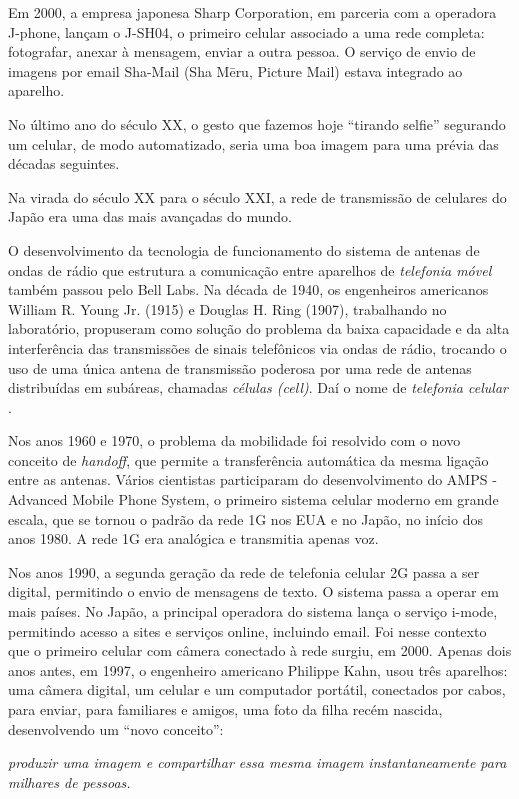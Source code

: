 \documentclass{hipatia}
\begin{document}
Em 2000, a empresa japonesa Sharp Corporation, em parceria com a operadora J-phone, lançam o J-SH04, o primeiro celular associado a uma rede completa: fotografar, anexar à mensagem, enviar a outra pessoa. O serviço de envio de imagens por email Sha-Mail (Sha Mēru, Picture Mail) estava integrado ao aparelho.

No último ano do século XX, o gesto que fazemos hoje ``tirando selfie'' segurando um celular, de modo automatizado, seria uma boa imagem para uma prévia das décadas seguintes.

Na virada do século XX para o século XXI, a rede de transmissão de celulares do Japão era uma das mais avançadas do mundo.

O desenvolvimento da tecnologia de funcionamento do sistema de antenas de ondas de rádio que estrutura a comunicação entre aparelhos de \textit{telefonia móvel} também passou pelo Bell Labs. Na década de 1940, os engenheiros americanos William R. Young Jr. (1915) e Douglas H. Ring (1907), trabalhando no laboratório, propuseram como solução do problema da baixa capacidade e da alta interferência das transmissões de sinais telefônicos via ondas de rádio, trocando o uso de uma única antena de transmissão poderosa por uma rede de antenas distribuídas em subáreas, chamadas \textit{células (cell)}. Daí o nome de \textit{telefonia celular} \cite{Agar2003}.

Nos anos 1960 e 1970, o problema da mobilidade foi resolvido com o novo conceito de \textit{handoff}, que permite a transferência automática da mesma ligação entre as antenas. Vários cientistas participaram do desenvolvimento do AMPS - Advanced Mobile Phone System, o primeiro sistema celular moderno em grande escala, que se tornou o padrão da rede 1G nos EUA e no Japão, no início dos anos 1980. A rede 1G era analógica e transmitia apenas voz.

 Nos anos 1990, a segunda geração da rede de telefonia celular 2G passa a ser digital, permitindo o envio de mensagens de texto. O sistema passa a operar em mais países. No Japão, a principal operadora do sistema lança o serviço i-mode, permitindo acesso a sites e serviços online, incluindo email. Foi nesse contexto que o primeiro celular com câmera conectado à rede surgiu, em 2000. Apenas dois anos antes, em 1997, o engenheiro americano Philippe Kahn, usou três aparelhos: uma câmera digital, um celular e um computador portátil, conectados por cabos, para enviar, para familiares e amigos, uma foto da filha recém nascida, desenvolvendo um ``novo conceito'':
\begin{center}
    \textit{produzir uma imagem e compartilhar essa mesma imagem instantaneamente para milhares de pessoas.}
\end{center}
\end{document}
